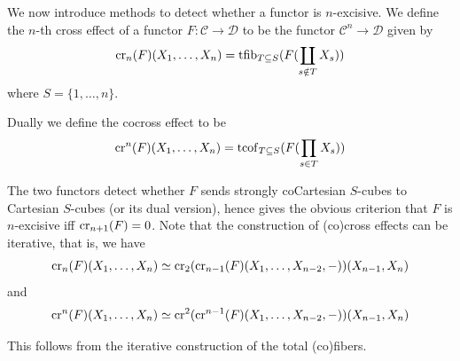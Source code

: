 	\begin{const}\label{Cross_eff}
		We now introduce methods to detect whether a functor is $n$-excisive. We define the $n$-th cross effect of a functor $F:\mathcal{C}\to\mathcal{D}$ to be the functor $\mathcal{C}^n\to\mathcal{D}$ given by 
		\[ \operatorname{\mathrm{cr}}_n(F)(X_1,\dots,X_n)=\operatorname{\mathrm{tfib}}_{T\subseteq S}(F(\coprod_{s\notin T}X_s)) \]
		where $S=\{1,\dots,n\}$. 

		Dually we define the cocross effect to be 
		\[ \operatorname{\mathrm{cr}}^n(F)(X_1,\dots,X_n)=\operatorname{\mathrm{tcof}}_{T\subseteq S}(F(\prod_{s\in T}X_s)) \]

		The two functors detect whether $F$ sends strongly coCartesian $S$-cubes to Cartesian $S$-cubes (or its dual version), hence gives the obvious criterion that $F$ is $n$-excisive iff $\operatorname{\mathrm{cr}}_{n+1}(F)=0$. 
		Note that the construction of (co)cross effects can be iterative, that is, we have 
		\[ \operatorname{\mathrm{cr}}_n(F)(X_1,\dots,X_n)\simeq\operatorname{\mathrm{cr}}_2(\operatorname{\mathrm{cr}}_{n-1}(F)(X_1,\dots,X_{n-2},-))(X_{n-1},X_n) \]
		and 
		\[ \operatorname{\mathrm{cr}}^n(F)(X_1,\dots,X_n)\simeq\operatorname{\mathrm{cr}}^2(\operatorname{\mathrm{cr}}^{n-1}(F)(X_1,\dots,X_{n-2},-))(X_{n-1},X_n) \]

		This follows from the iterative construction of the total (co)fibers. 
	\end{const}

